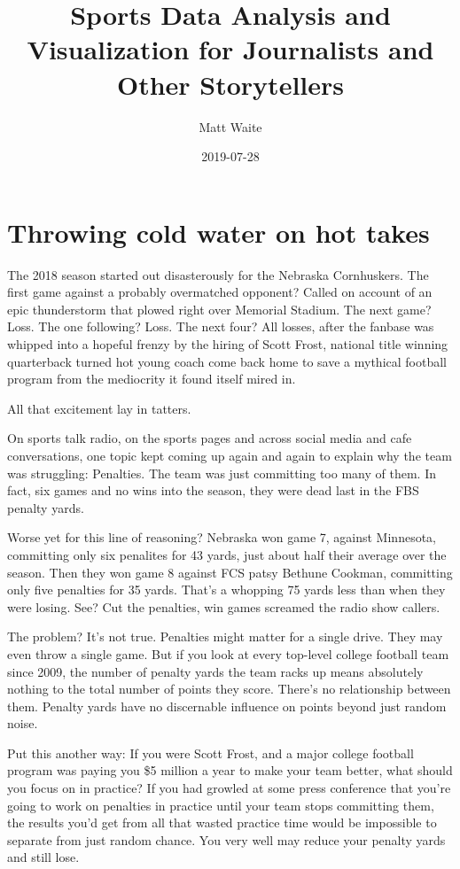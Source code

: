 \documentclass[]{book}
\title{Sports Data Analysis and Visualization for Journalists and Other
Storytellers}
\author{Matt Waite}
\date{2019-07-28}
\begin{document}
\maketitle

{
\setcounter{tocdepth}{1}
\tableofcontents
}
\chapter{Throwing cold water on hot
takes}\label{throwing-cold-water-on-hot-takes}

The 2018 season started out disasterously for the Nebraska Cornhuskers.
The first game against a probably overmatched opponent? Called on
account of an epic thunderstorm that plowed right over Memorial Stadium.
The next game? Loss. The one following? Loss. The next four? All losses,
after the fanbase was whipped into a hopeful frenzy by the hiring of
Scott Frost, national title winning quarterback turned hot young coach
come back home to save a mythical football program from the mediocrity
it found itself mired in.

All that excitement lay in tatters.

On sports talk radio, on the sports pages and across social media and
cafe conversations, one topic kept coming up again and again to explain
why the team was struggling: Penalties. The team was just committing too
many of them. In fact, six games and no wins into the season, they were
dead last in the FBS penalty yards.

Worse yet for this line of reasoning? Nebraska won game 7, against
Minnesota, committing only six penalites for 43 yards, just about half
their average over the season. Then they won game 8 against FCS patsy
Bethune Cookman, committing only five penalties for 35 yards. That's a
whopping 75 yards less than when they were losing. See? Cut the
penalties, win games screamed the radio show callers.

The problem? It's not true. Penalties might matter for a single drive.
They may even throw a single game. But if you look at every top-level
college football team since 2009, the number of penalty yards the team
racks up means absolutely nothing to the total number of points they
score. There's no relationship between them. Penalty yards have no
discernable influence on points beyond just random noise.

Put this another way: If you were Scott Frost, and a major college
football program was paying you \$5 million a year to make your team
better, what should you focus on in practice? If you had growled at some
press conference that you're going to work on penalties in practice
until your team stops committing them, the results you'd get from all
that wasted practice time would be impossible to separate from just
random chance. You very well may reduce your penalty yards and still
lose.
\end{document}
